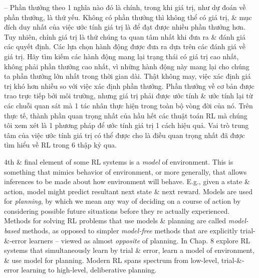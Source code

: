 \documentclass{article}
\begin{document}
\begin{itemize}
\begin{itemize}
        -- Phần thưởng theo 1 nghĩa nào đó là chính, trong khi giá trị, như dự đoán về phần thưởng, là thứ yếu. Không có phần thưởng thì không thể có giá trị, \& mục đích duy nhất của việc ước tính giá trị là để đạt được nhiều phần thưởng hơn. Tuy nhiên, chính giá trị là thứ chúng ta quan tâm nhất khi đưa ra \& đánh giá các quyết định. Các lựa chọn hành động được đưa ra dựa trên các đánh giá về giá trị. Hãy tìm kiếm các hành động mang lại trạng thái có giá trị cao nhất, không phải phần thưởng cao nhất, vì những hành động này mang lại cho chúng ta phần thưởng lớn nhất trong thời gian dài. Thật không may, việc xác định giá trị khó hơn nhiều so với việc xác định phần thưởng. Phần thưởng về cơ bản được trao trực tiếp bởi môi trường, nhưng giá trị phải được ước tính \& ước tính lại từ các chuỗi quan sát mà 1 tác nhân thực hiện trong toàn bộ vòng đời của nó. Trên thực tế, thành phần quan trọng nhất của hầu hết các thuật toán RL mà chúng tôi xem xét là 1 phương pháp để ước tính giá trị 1 cách hiệu quả. Vai trò trung tâm của việc ước tính giá trị có thể được cho là điều quan trọng nhất đã được tìm hiểu về RL trong 6 thập kỷ qua.

        4th \& final element of some RL systems is a {\it model} of environment. This is something that mimics behavior of environment, or more generally, that allows inferences to be made about how environment will behave. E.g., given a state \& action, model might predict resultant next state \& next reward. Models are used for {\it planning}, by which we mean any way of deciding on a course of action by considering possible future situations before they re actually experienced. Methods for solving RL problems that use models \& planning are called {\it model-based} methods, as opposed to simpler {\it model-free} methods that are explicitly trial-\&-error learners -- viewed as almost {\it opposite} of planning. In Chap. 8 explore RL systems that simultaneously learn by trial \& error, learn a model of environment, \& use model for planning. Modern RL spans spectrum from low-level, trial-\&-error learning to high-level, deliberative planning.


\end{itemize}
\end{itemize}
\end{document}
